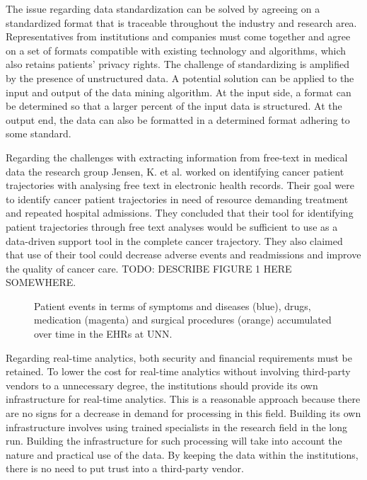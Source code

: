 The issue regarding data standardization can be solved by agreeing on a standardized format that is traceable throughout the industry and research area. Representatives from institutions and companies must come together and agree on a set of formats compatible with existing technology and algorithms, which also retains patients’ privacy rights. The challenge of standardizing is amplified by the presence of unstructured data. A potential solution can be applied to the input and output of the data mining algorithm. At the input side, a format can be determined so that a larger percent of the input data is structured. At the output end, the data can also be formatted in a determined format adhering to some standard.

Regarding the challenges with extracting information from free-text in medical data the research group Jensen, K. et al.\cite{freetext} worked on identifying cancer patient trajectories with analysing free text in electronic health records. Their goal were to identify cancer patient trajectories in need of resource demanding treatment and repeated hospital admissions. They concluded that their tool for identifying patient trajectories through free text analyses would be sufficient to use as a data-driven support tool in the complete cancer trajectory. They also claimed that use of their tool could decrease adverse events and readmissions and improve the quality of cancer care. 
TODO: DESCRIBE FIGURE 1 HERE SOMEWHERE. 

\begin{figure}[]
\begin{center}
\end{center}
\caption{Patient events in terms of symptoms and diseases (blue), drugs, medication (magenta) and surgical procedures (orange) accumulated over time in the EHRs at UNN.\cite{freetext}}\label{fig:ackseq}
\end{figure}

Regarding real-time analytics, both security and financial requirements must be retained. To lower the cost for real-time analytics without involving third-party vendors to a unnecessary degree, the institutions should provide its own infrastructure for real-time analytics. This is a reasonable approach because there are no signs for a decrease in demand for processing in this field. Building its own infrastructure involves using trained specialists in the research field in the long run. Building the infrastructure for such processing will take into account the nature and practical use of the data. By keeping the data within the institutions, there is no need to put trust into a third-party vendor.


